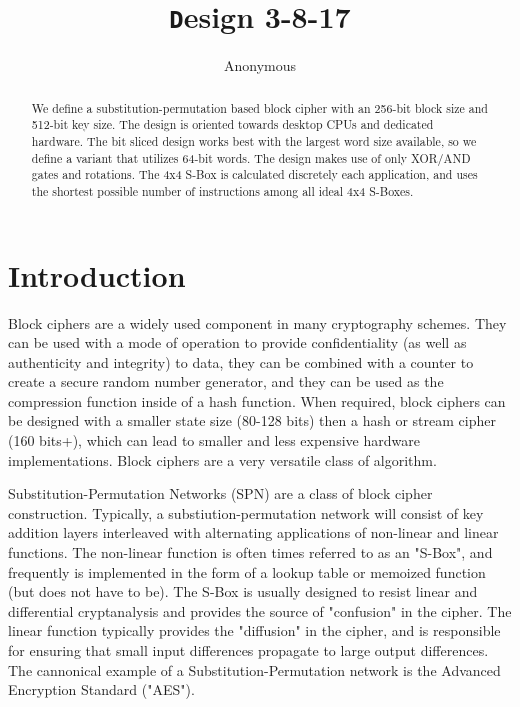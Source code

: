 \documentclass[preprint]{iacrtrans}
\author{Anonymous\inst{1}}
\institute{City, State \email{address@provider.com}}
\title[\texttt Design 3-8-17]{\texttt Design 3-8-17}
\begin{document}
\maketitle


\begin{abstract}
  We define a substitution-permutation based block cipher with an 256-bit block size and 512-bit key size. The design is oriented towards desktop CPUs and dedicated hardware. The bit sliced design works best with the largest word size available, so we define a variant that utilizes 64-bit words. The design makes use of only XOR/AND gates and rotations. The 4x4 S-Box is calculated discretely each application, and uses the shortest possible number of instructions among all ideal 4x4 S-Boxes.\\ 
\end{abstract}

\todototoc
\listoftodos

\section{Introduction}
 Block ciphers are a widely used component in many cryptography schemes. They can be used with a mode of operation to provide confidentiality (as well as authenticity and integrity) to data, they can be combined with a counter to create a secure random number generator, and they can be used as the compression function inside of a hash function. When required, block ciphers can be designed with a smaller state size (80-128 bits) then a hash or stream cipher (160 bits+), which can lead to smaller and less expensive hardware implementations. Block ciphers are a very versatile class of algorithm.

Substitution-Permutation Networks (SPN) are a class of block cipher construction. Typically, a substiution-permutation network will consist of key addition layers interleaved with alternating applications of non-linear and linear functions. The non-linear function is often times referred to as an "S-Box", and frequently is implemented in the form of a lookup table or memoized function (but does not have to be). The S-Box is usually designed to resist linear and differential cryptanalysis and provides the source of "confusion" in the cipher. The linear function typically provides the "diffusion" in the cipher, and is responsible for ensuring that small input differences propagate to large output differences. The cannonical example of a Substitution-Permutation network is the Advanced Encryption Standard ("AES").
\end{document}
